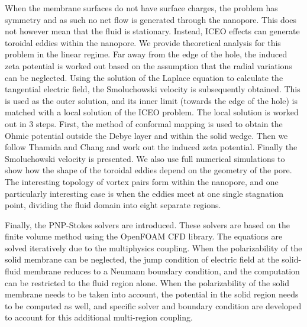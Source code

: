 When the membrane surfaces do not have surface charges, the problem has symmetry and as such no net flow is generated through the nanopore. This does not however mean that the fluid is stationary. Instead, ICEO effects can generate toroidal eddies within the nanopore. We provide theoretical analysis for this problem in the linear regime. Far away from the edge of the hole, the induced zeta potential is worked out based on the assumption that the radial variations can be neglected. Using the solution of the Laplace equation to calculate the tangential electric field, the Smoluchowski velocity is subsequently obtained. This is used as the outer solution, and its inner limit (towards the edge of the hole) is matched with a local solution of the ICEO problem. The local solution is worked out in 3 steps. First, the method of conformal mapping is used to obtain the Ohmic potential outside the Debye layer and within the solid wedge. Then we follow Thamida and Chang \cite{Thamida2002} and work out the induced zeta potential. Finally the Smoluchowski velocity is presented. We also use full numerical simulations to show how the shape of the toroidal eddies depend on the geometry of the pore. The interesting topology of vortex pairs form within the nanopore, and one particularly interesting case is when the eddies meet at one single stagnation point, dividing the fluid domain into eight separate regions.

Finally, the PNP-Stokes solvers are introduced. These solvers are based on the finite volume method using the OpenFOAM CFD library. The equations are solved iteratively due to the multiphysics coupling. When the polarizability of the solid membrane can be neglected, the jump condition of electric field at the solid-fluid membrane reduces to a Neumann boundary condition, and the computation can be restricted to the fluid region alone. When the polarizability of the solid membrane needs to be taken into account, the potential in the solid region needs to be computed as well, and specific solver and boundary condition are developed to account for this additional multi-region coupling.